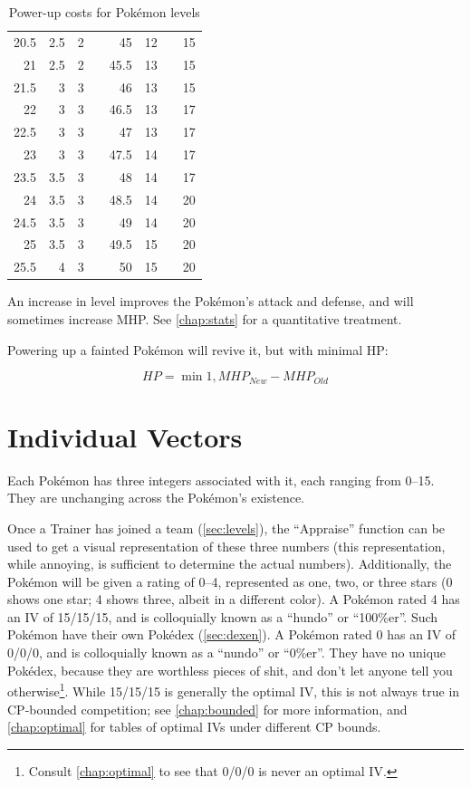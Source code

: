 \begin{table}
\begin{center}
\begin{tabular}[ht]{rrrr|rrrr}
     20.5 & 2.5 & 2 & &   45 &  12 &    & 15 \\
       21 & 2.5 & 2 & & 45.5 &  13 &    & 15 \\
     21.5 &   3 & 3 & &   46 &  13 &    & 15 \\
       22 &   3 & 3 & & 46.5 &  13 &    & 17 \\
     22.5 &   3 & 3 & &   47 &  13 &    & 17 \\
       23 &   3 & 3 & & 47.5 &  14 &    & 17 \\
     23.5 & 3.5 & 3 & &   48 &  14 &    & 17 \\
       24 & 3.5 & 3 & & 48.5 &  14 &    & 20 \\
     24.5 & 3.5 & 3 & &   49 &  14 &    & 20 \\
       25 & 3.5 & 3 & & 49.5 &  15 &    & 20 \\
     25.5 &   4 & 3 & &   50 &  15 &    & 20 \\
    \end{tabular}
  \end{center}
  \caption{Power-up costs for Pokémon levels}
  \label{table:powerups}
\end{table}
An increase in level improves the Pokémon's attack and defense, and
  will sometimes increase MHP.
See \autoref{chap:stats} for a quantitative treatment.

Powering up a fainted Pokémon will revive it, but with minimal HP\@:

\[ HP = \min{1, MHP_{New} - MHP_{Old} } \]

\section{Individual Vectors}
\label{sec:ivs}
Each Pokémon has three integers associated with it, each ranging from 0--15.
They are unchanging across the Pokémon's existence.

Once a Trainer has joined a team (\autoref{sec:levels}), the ``Appraise'' function can be used to
  get a visual representation of these three numbers (this representation,
  while annoying, is sufficient to determine the actual numbers).
Additionally, the Pokémon will be given a rating of 0--4, represented as
  one, two, or three stars (0 shows one star; 4 shows three, albeit in a different color).
A Pokémon rated 4 has an IV of 15/15/15, and is colloquially known as a ``hundo'' or ``100\%er''.
Such Pokémon have their own Pokédex (\autoref{sec:dexen}).
A Pokémon rated 0 has an IV of 0/0/0, and is colloquially known as a ``nundo'' or ``0\%er''.
They have no unique Pokédex, because they are worthless pieces of shit,
  and don't let anyone tell you otherwise\footnote{Consult \autoref{chap:optimal}
  to see that 0/0/0 is never an optimal IV.}.
While 15/15/15 is generally the optimal IV, this is not always true in CP-bounded
  competition; see \autoref{chap:bounded} for more information,
  and \autoref{chap:optimal} for tables of optimal IVs under different CP bounds.

